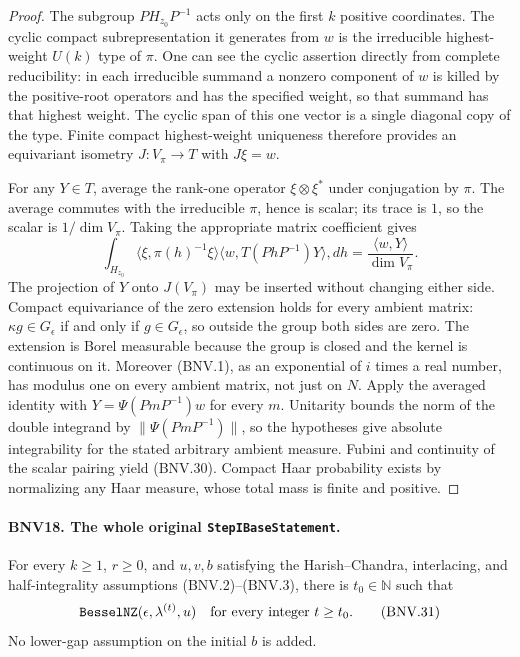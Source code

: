 \documentclass[11pt,a4paper]{article}
\numberwithin{equation}{section}
\theoremstyle{remark}\newtheorem{remark}[theorem]{Remark}
\begin{document}
\begin{proof}
The subgroup $PH_{z_0}P^{-1}$ acts only on the first $k$ positive
coordinates.  The cyclic compact subrepresentation it generates from
$w$ is the irreducible highest-weight $U(k)$ type of $\pi$.
One can see the cyclic assertion directly from complete reducibility:
in each irreducible summand a nonzero component of $w$ is killed by the
positive-root operators and has the specified weight, so that summand
has that highest weight.  The cyclic span of this one vector is a single
diagonal copy of the type.  Finite compact highest-weight uniqueness
therefore provides an equivariant isometry $J:V_\pi\to T$ with $J\xi=w$.

For any $Y\in T$, average the rank-one operator $\xi\otimes\xi^*$
under conjugation by $\pi$.  The average commutes with the irreducible
$\pi$, hence is scalar; its trace is $1$, so the scalar is
$1/\dim V_\pi$.  Taking the appropriate matrix coefficient gives
\[
 \int_{H_{z_0}}
 \langle\xi,\pi(h)^{-1}\xi\rangle
 \langle w,T(PhP^{-1})Y\rangle,dh
      =\frac{\langle w,Y\rangle}{\dim V_\pi}.
\]
The projection of $Y$ onto $J(V_\pi)$ may be inserted without changing
either side.  Compact equivariance of the zero extension holds for
every ambient matrix: $\kappa g\in G_\epsilon$ if and only if
$g\in G_\epsilon$, so outside the group both sides are zero.
The extension is Borel measurable because the group is closed and
the kernel is continuous on it.  Moreover (BNV.1), as an exponential
of $i$ times a real number, has modulus one on every ambient matrix,
not just on $N$.  Apply the averaged identity with
$Y=\Psi(PmP^{-1})w$ for every $m$.  Unitarity bounds the norm of the
double integrand by $\|\Psi(PmP^{-1})\|$, so the hypotheses give
absolute integrability for the stated arbitrary ambient measure.
Fubini and continuity of the scalar pairing yield
(BNV.30).  Compact Haar probability exists by normalizing any Haar
measure, whose total mass is finite and positive.
\end{proof}

\paragraph{BNV18. The whole original \texttt{Step\allowbreak IBase\allowbreak Statement}.}
\label{claim:BNV18}
For every $k\ge1$, $r\ge0$, and $u,v,b$ satisfying the Harish--Chandra,
interlacing, and half-integrality assumptions (BNV.2)--(BNV.3), there is
$t_0\in\mathbb N$ such that
\[
 \texttt{Bessel\allowbreak NZ}(\epsilon,\lambda^{(t)},u)
          \quad\text{for every integer }t\ge t_0.
 \tag{BNV.31}
\]
No lower-gap assumption on the initial $b$ is added.
\end{document}
